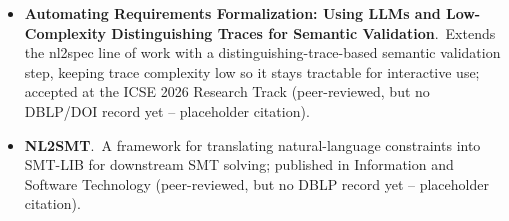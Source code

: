 \documentclass[natbib=false,acmsmall,nonacm,11pt]{acmart}
\begin{document}
\begin{itemize}
\item \textbf{Automating Requirements Formalization: Using LLMs and Low-Complexity Distinguishing Traces for Semantic Validation}.~Extends the nl2spec line of work with a distinguishing-trace-based semantic validation step, keeping trace complexity low so it stays tractable for interactive use; accepted at the ICSE 2026 Research Track (peer-reviewed, but no DBLP/DOI record yet -- placeholder citation).~\cite{placeholder_mendoza2026_icse}
\item \textbf{NL2SMT}.~A framework for translating natural-language constraints into SMT-LIB for downstream SMT solving; published in Information and Software Technology (peer-reviewed, but no DBLP record yet -- placeholder citation).~\cite{placeholder_miao2026_nl2smt}
\end{itemize}
\end{document}
